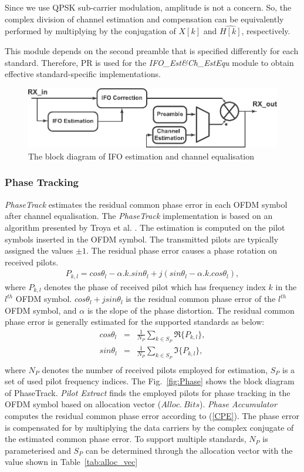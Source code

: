 Since we use QPSK sub-carrier modulation, amplitude is not a concern. So, the complex division of channel estimation and compensation can be equivalently performed by multiplying by the conjugation of $X[k]$ and $\hat{H[k]}$, respectively.

This module depends on the second preamble that is specified differently for each standard.
Therefore, PR is used for the \emph{IFO\_Est\&Ch\_EstEqu} module to obtain effective standard-specific implementations.
\begin{figure}
\centering
\includegraphics [width=0.7\columnwidth]{Figures/MSCR_RX_IFOCh.pdf}
\caption{The block diagram of IFO estimation and channel equalisation}
\label{fig:IFO}
\end{figure}

\subsubsection{Phase Tracking}
\emph{PhaseTrack} estimates the residual common phase error in each OFDM symbol after channel equalisation.
The \emph{PhaseTrack} implementation is based on an algorithm presented by Troya et al. \cite{Troya2007}.
The estimation is computed on the pilot symbols inserted in the OFDM symbol. The transmitted pilots are typically assigned
the values $\pm 1$. The residual phase error causes a phase rotation on received pilots.
\begin{eqnarray}
\label{PhaseTrack}
P_{k,l} = cos\theta_{l} -\alpha.k.sin \theta_{l} + j (sin\theta_{l} -\alpha.k.cos\theta_{l}),
\end{eqnarray}
where $P_{k,l}$ denotes the phase of received pilot which has frequency index $k$ in the $l^{th}$ OFDM symbol.
$cos\theta_{l} + j sin\theta_{l}$ is the residual common phase error of the $l^{th}$ OFDM symbol, and $\alpha$ is the slope of the phase distortion.
The residual common phase error is generally estimated for the supported standards as below:
\begin{eqnarray}
\label{CPE}
cos\theta_{l} &=& \frac{1}{N_P} \sum_{k \in S_P} \Re\{P_{k,l}\}, \\ \nonumber
sin\theta_{l} &=& \frac{1}{N_P} \sum_{k \in S_P} \Im\{P_{k,l}\}, \\ \nonumber
\end{eqnarray}
where $N_P$ denotes the number of received pilots employed for estimation, $S_P$ is a set of used pilot frequency indices.
The Fig.~\ref{fig:Phase} shows the block diagram of PhaseTrack. \emph{Pilot Extract} finds the employed pilots for phase tracking in the OFDM symbol based on allocation vector ($Alloc.~Bits$).
\emph{Phase Accumulator} computes the residual common phase error according to (\ref{CPE}).
The phase error is compensated for by multiplying the data carriers by the complex conjugate of the estimated common phase error.
To support multiple standards, $N_P$ is parameterised and $S_P$ can be determined through the allocation vector with the value shown in Table~\ref{tab:alloc_vec}

